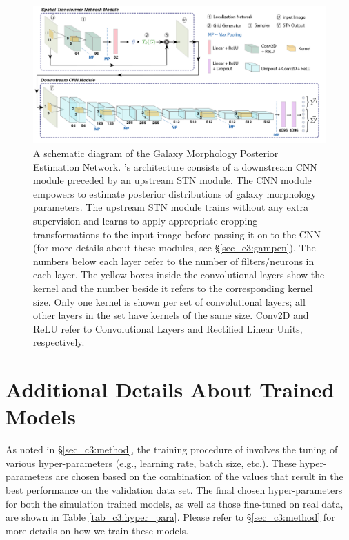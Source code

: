 \begin{figure}[htb]
    \centering
    \includegraphics[width
    =\textwidth]{gampen_schematic.png}
    \caption{A schematic diagram of the Galaxy Morphology Posterior Estimation Network. \gampen's architecture consists of a downstream CNN module preceded by an upstream STN module. The CNN module empowers \gampen{} to estimate posterior distributions of galaxy morphology parameters. The upstream STN module trains without any extra supervision and learns to apply appropriate cropping transformations to the input image before passing it on to the CNN (for more details about these modules, see \S \ref{sec_c3:gampen}).
    The numbers below each layer refer to the number of filters/neurons in each layer. The yellow boxes inside the convolutional layers show the kernel and the number beside it refers to the corresponding kernel size. Only one kernel is shown per set of convolutional layers; all other layers in the set have kernels of the same size. Conv2D and ReLU refer to Convolutional Layers and Rectified Linear Units, respectively.}
    \label{fig_c3:gampen_schematic}
\end{figure}

\section{Additional Details About Trained \gampen{} Models}\label{ap:sec_c3:trained_models}

As noted in \S \ref{sec_c3:method}, the training procedure of \gampen{} involves the tuning of various hyper-parameters (e.g., learning rate, batch size, etc.). These hyper-parameters are chosen based on the combination of the values that result in the best performance on the validation data set. The final chosen hyper-parameters for both the simulation trained \gampen{} models, as well as those fine-tuned on real data, are shown in Table \ref{tab_c3:hyper_para}. Please refer to \S \ref{sec_c3:method} for more details on how we train these models.


